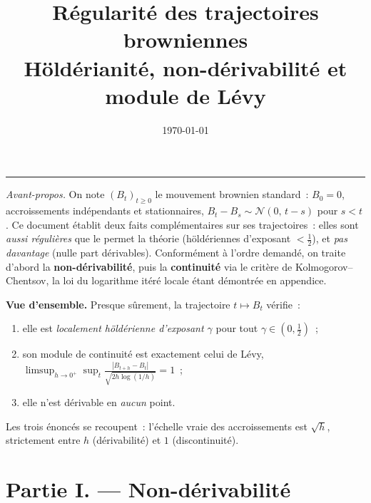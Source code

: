 \documentclass[11pt,a4paper]{article}
\title{\bfseries R\'egularit\'e des trajectoires browniennes\\[2pt]
\large H\"old\'erianit\'e, non-d\'erivabilit\'e et module de L\'evy}
\author{}
\date{\today}
\theoremstyle{plain}
\theoremstyle{definition}
\newcommand{\Loi}{\mathcal{N}}
\newcommand{\abs}[1]{\left\lvert #1 \right\rvert}
\begin{document}
\maketitle
\vspace{-2.2em}

\begin{center}
\rule{0.42\textwidth}{0.4pt}
\end{center}

\noindent\textit{Avant-propos.} On note $(B_t)_{t\ge 0}$ le mouvement brownien standard~: $B_0=0$, accroissements ind\'ependants et stationnaires, $B_t-B_s\sim\Loi(0,\,t-s)$ pour $s<t$. Ce document \'etablit deux faits compl\'ementaires sur ses trajectoires~: elles sont \emph{aussi r\'eguli\`eres} que le permet la th\'eorie (h\"old\'eriennes d'exposant $<\tfrac12$), et \emph{pas davantage} (nulle part d\'erivables). Conform\'ement \`a l'ordre demand\'e, on traite d'abord la \textbf{non-d\'erivabilit\'e}, puis la \textbf{continuit\'e} via le crit\`ere de Kolmogorov--Chentsov, la loi du logarithme it\'er\'e locale \'etant d\'emontr\'ee en appendice.

\begin{apercu}
\textbf{Vue d'ensemble.} Presque s\^urement, la trajectoire $t\mapsto B_t$ v\'erifie~:
\begin{enumerate}[label=\textbf{(\alph*)},leftmargin=2.2em,itemsep=2pt]
\item elle est \emph{localement h\"old\'erienne d'exposant $\gamma$} pour tout $\gamma\in(0,\tfrac12)$~;
\item son module de continuit\'e est exactement celui de L\'evy, $\displaystyle\limsup_{h\to0^+}\sup_t \frac{\abs{B_{t+h}-B_t}}{\sqrt{2h\log(1/h)}}=1$~;
\item elle n'est d\'erivable en \emph{aucun} point.
\end{enumerate}
Les trois \'enonc\'es se recoupent~: l'\'echelle vraie des accroissements est $\sqrt h$, strictement entre $h$ (d\'erivabilit\'e) et $1$ (discontinuit\'e).
\end{apercu}

\tableofcontents
\bigskip

\part*{Partie I. — Non-d\'erivabilit\'e}
\end{document}
